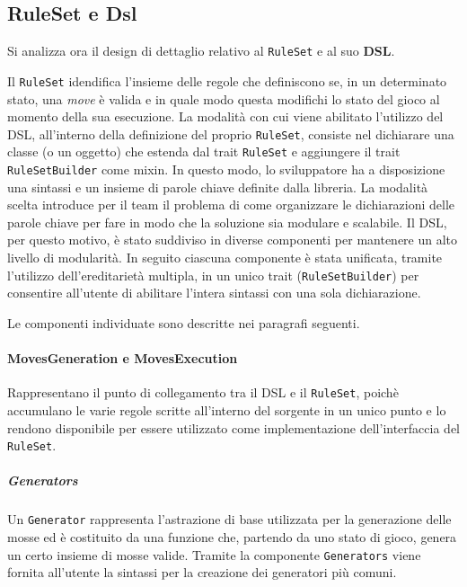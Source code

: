 
\subsection{RuleSet e Dsl}\label{sec:dsl_design}

Si analizza ora il design di dettaglio relativo al \texttt{RuleSet} e al suo \textbf{DSL}.

Il \texttt{RuleSet} idendifica l'insieme delle regole che definiscono se, in un determinato stato, una \textit{move} è valida e in quale modo questa modifichi lo stato del gioco al momento della sua esecuzione.
%
La modalità con cui viene abilitato l'utilizzo del DSL, all'interno della definizione del proprio \texttt{RuleSet}, consiste nel dichiarare una classe (o un oggetto) che estenda dal trait \texttt{RuleSet} e aggiungere il trait \texttt{RuleSetBuilder} come mixin.
%
In questo modo, lo sviluppatore ha a disposizione una sintassi e un insieme di parole chiave definite dalla libreria.
%
La modalità scelta introduce per il team il problema di come organizzare le dichiarazioni delle parole chiave per fare in modo che la soluzione sia modulare e scalabile.
%
Il DSL, per questo motivo, è stato suddiviso in diverse componenti per mantenere un alto livello di modularità.
%
In seguito ciascuna componente è stata unificata, tramite l'utilizzo dell'ereditarietà multipla, in un unico trait (\texttt{RuleSetBuilder}) per consentire all'utente di abilitare l'intera sintassi con una sola dichiarazione.

Le componenti individuate sono descritte nei paragrafi seguenti.

\paragraph{MovesGeneration e MovesExecution}
Rappresentano il punto di collegamento tra il DSL e il \texttt{RuleSet}, poichè accumulano le varie regole scritte all'interno del sorgente in un unico punto e lo rendono disponibile per essere utilizzato come implementazione dell'interfaccia del \texttt{RuleSet}.

\subparagraph{Generators}
Un \texttt{Generator} rappresenta l'astrazione di base utilizzata per la generazione delle mosse ed è costituito da una funzione che, partendo da uno stato di gioco, genera un certo insieme di mosse valide.
%
Tramite la componente \texttt{Generators} viene fornita all'utente la sintassi per la creazione dei generatori più comuni.

